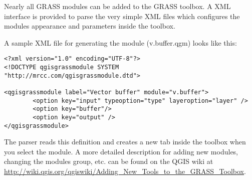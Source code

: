 Nearly all GRASS modules can be added to the GRASS toolbox. A XML 
interface is provided to parse the very simple XML files which configures the modules appearance and parameters inside the toolbox.

A sample XML file for generating the module  (v.buffer.qgm) looks like this:
\begin{verbatim}
<?xml version="1.0" encoding="UTF-8"?>
<!DOCTYPE qgisgrassmodule SYSTEM "http://mrcc.com/qgisgrassmodule.dtd">

<qgisgrassmodule label="Vector buffer" module="v.buffer">
        <option key="input" typeoption="type" layeroption="layer" />
        <option key="buffer"/>
        <option key="output" />
</qgisgrassmodule>
\end{verbatim}

The parser reads this definition and creates a new tab inside the toolbox when you select the module. A more detailed description for adding new modules, changing the modules group, etc. can be found on the QGIS wiki at \\ \url{http://wiki.qgis.org/qgiswiki/Adding\_New\_Tools\_to\_the\_GRASS\_Toolbox}.

